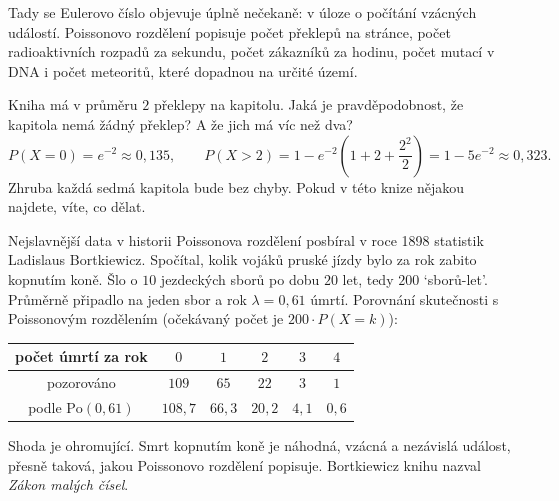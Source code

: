 Tady se Eulerovo číslo objevuje úplně nečekaně: v úloze o počítání vzácných událostí. Poissonovo rozdělení popisuje počet překlepů na stránce, počet radioaktivních rozpadů za sekundu, počet zákazníků za hodinu, počet mutací v DNA i počet meteoritů, které dopadnou na určité území.

\begin{example}
  Kniha má v průměru $2$ překlepy na kapitolu. Jaká je pravděpodobnost, že kapitola nemá žádný překlep? A že jich má víc než dva?
  \begin{equation*}
    P(X = 0) = e^{-2}\approx 0{,}135,\qquad P(X > 2) = 1 - e^{-2}\left(1 + 2 + \frac{2^2}{2}\right) = 1 - 5e^{-2}\approx 0{,}323.
  \end{equation*}
  Zhruba každá sedmá kapitola bude bez chyby. Pokud v této knize nějakou najdete, víte, co dělat.
\end{example}

\begin{example}
  Nejslavnější data v historii Poissonova rozdělení posbíral v roce 1898 statistik Ladislaus Bortkiewicz. Spočítal, kolik vojáků pruské jízdy bylo za rok zabito kopnutím koně. Šlo o $10$ jezdeckých sborů po dobu $20$ let, tedy $200$ `sborů-let'. Průměrně připadlo na jeden sbor a rok $\lambda = 0{,}61$ úmrtí. Porovnání skutečnosti s Poissonovým rozdělením (očekávaný počet je $200\cdot P(X = k)$):
  \begin{center}
    \renewcommand{\arraystretch}{1.3}
    \begin{tabular}{|c|c|c|c|c|c|}
      \hline
      počet úmrtí za rok & $0$ & $1$ & $2$ & $3$ & $4$ \\
      \hline
      pozorováno & $109$ & $65$ & $22$ & $3$ & $1$ \\
      podle $\mathrm{Po}(0{,}61)$ & $108{,}7$ & $66{,}3$ & $20{,}2$ & $4{,}1$ & $0{,}6$ \\
      \hline
    \end{tabular}
  \end{center}
  \begin{center}
  \end{center}
  Shoda je ohromující. Smrt kopnutím koně je náhodná, vzácná a nezávislá událost, přesně taková, jakou Poissonovo rozdělení popisuje. Bortkiewicz knihu nazval \textit{Zákon malých čísel}.
\end{example}

